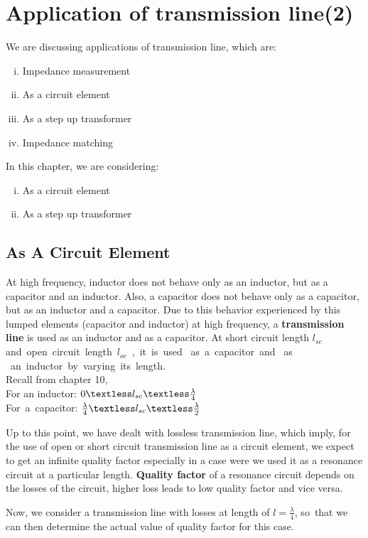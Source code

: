 \chapter{Application of transmission line(2)}
We are discussing applications of transmission line, which are:
\begin{enumerate}[(i)]
\item Impedance measurement
\item As a circuit element
\item As a step up transformer
\item Impedance matching 
\end{enumerate}

In this chapter, we are considering:
\begin{enumerate}[(i)]
\item As a circuit element
\item As a step up transformer
\end{enumerate}

\section{As A Circuit Element}
At high frequency, inductor does not behave only as an inductor, but as a capacitor and an inductor. Also, a capacitor does not behave only as a capacitor, but as an inductor and a capacitor. Due to this behavior experienced by this lumped elements (capacitor and inductor) at high frequency, a \textbf{transmission line} is used as an inductor and as a capacitor.
At short circuit length $l_{sc}$ and\ open\ circuit\ length\ $l_{oc}$\ ,\ it\ is\ used \ as\ a\ capacitor\ and \ as \ an\ inductor\ by\ varying\ its\ length.\\
Recall from chapter 10,\\
For an inductor: $0 \textless l_{sc} \textless 
\frac{\lambda}{4}$\\
For\ a\ capacitor: $\frac{\lambda}{4} \textless l_{sc} \textless \frac{\lambda}{2} $


Up to this point, we have dealt with lossless transmission line, which imply, for the use of open or short circuit transmission line as a circuit element, we expect to get an infinite quality factor especially in a case were we used it as a resonance circuit at a particular length. \textbf{Quality factor} of a resonance circuit depends on the losses of the circuit, higher loss leads to low quality factor and vice versa.

Now, we consider a transmission line with losses at length of $ l=\frac{\lambda}{4} $, so\ that we can then determine the actual value of quality factor for this case.\\

